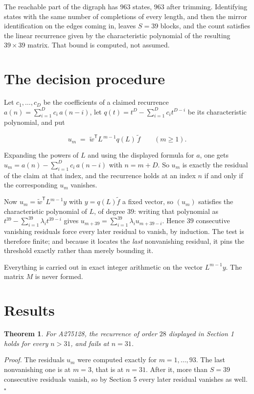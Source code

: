 \documentclass[11pt]{article}
\newtheorem{theorem}{Theorem}
\theoremstyle{definition}
\begin{document}
The reachable part of the digraph has $963$ states, $963$ after trimming. Identifying states with the same number of completions of every length, and then the mirror identification on the edges coming in, leaves $S = 39$ blocks, and the count satisfies the linear recurrence given by the characteristic polynomial of the resulting $39\times39$ matrix. That bound is computed, not assumed.

\section{The decision procedure}

Let $c_1,\dots,c_D$ be the coefficients of a claimed recurrence $a(n) = \sum_{i=1}^{D} c_i\,a(n-i)$, let $q(t) = t^{D} - \sum_{i=1}^{D} c_i t^{D-i}$ be its characteristic polynomial, and put

\[u_m \;=\; \tilde w^{\mathsf T} L^{\,m-1} q(L)\,\tilde f \qquad (m \ge 1).\]

Expanding the powers of $L$ and using the displayed formula for $a$, one gets $u_m = a(n) - \sum_{i=1}^{D} c_i\,a(n-i)$ with $n = m + D$. So $u_m$ is exactly the residual of the claim at that index, and the recurrence holds at an index $n$ if and only if the corresponding $u_m$ vanishes.

Now $u_m = \tilde w^{\mathsf T} L^{m-1} y$ with $y = q(L)\tilde f$ a fixed vector, so $(u_m)$ satisfies the characteristic polynomial of $L$, of degree $39$: writing that polynomial as $t^{39} - \sum_{i=1}^{39} \lambda_i t^{39-i}$ gives $u_{m+39} = \sum_{i=1}^{39} \lambda_i u_{m+39-i}$. Hence $39$ consecutive vanishing residuals force every later residual to vanish, by induction. The test is therefore finite; and because it locates the {\itshape last} nonvanishing residual, it pins the threshold exactly rather than merely bounding it.

Everything is carried out in exact integer arithmetic on the vector $L^{m-1}y$. The matrix $M$ is never formed.

\section{Results}

\begin{theorem} For A275128, the recurrence of order $28$ displayed in Section 1 holds for every $n > 31$, and fails at $n = 31$.\end{theorem}

{\itshape Proof.} The residuals $u_m$ were computed exactly for $m = 1,\dots,93$. The last nonvanishing one is at $m = 3$, that is at $n = 31$. After it, more than $S = 39$ consecutive residuals vanish, so by Section 5 every later residual vanishes as well. $\square$
\end{document}
